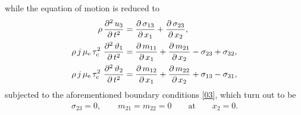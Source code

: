 \documentclass[10pt]{article}
\begin{document}
 while the equation of motion  {is} reduced to 
 \begin{align}\label{49}
 \rho\,\frac{\partial^2 \, {u}_{3}}{\partial\,t^2}&=\frac{\partial \,\sigma_{13}}{\partial \,x_1}+\frac{\partial \,\sigma_{23}}{\partial \,x_2},\notag\\
 \rho\,j\,\mu_{\rm e}\,\tau_{\rm c}^2\, \,\frac{\partial^2 \,{\vartheta _{1}}}{\partial\,t^2}&= \frac{\partial \,m_{11}}{\partial \,x_1}+ \frac{\partial \,m_{21}}{\partial \,x_2}-\sigma_{23}+\sigma_{32},\\
\rho\,j\,\mu_{\rm e}\,\tau_{\rm c}^2\, \,\frac{\partial^2 \,{\vartheta _{2}}}{\partial\,t^2}&= \frac{\partial \,m_{12}}{\partial \,x_1}+ \frac{\partial \,m_{22}}{\partial \,x_2}+\sigma_{13}-\sigma_{31},\notag
 \end{align}
 subjected to the aforementioned boundary conditions  \eqref{03}, which turn out to be
 \begin{align}\label{50}
 \sigma_{23}=0,\qquad m_{21}=m_{22}=0 \qquad \text{at}\qquad x_2=0.
 \end{align}
 
\end{document}

